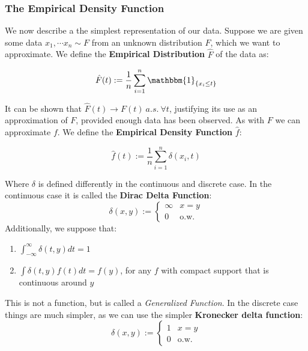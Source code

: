 \documentclass[]{article}
\theoremstyle{mattstyle}
\theoremstyle{definition}
\begin{document}
\subsubsection{The Empirical Density Function}

We now describe a the simplest representation of our data. Suppose we are given some data \(x_1, \cdots x_n \sim F\) from an unknown distribution $F$, which we want to approximate. We define the \textbf{Empirical Distribution} $\hat{F}$ of the data as:

\begin{equation}\label{sec:empdist}
\hat{F}(t) := \frac{1}{n}\sum_{i=1}^n \mathbbm{1}_{\{x_i \le t\}}
\end{equation} 

It can be shown that $\hat{F}(t) \rightarrow F(t) \ a.s.\ \forall t$, justifying its use as an approximation of $F$, provided enough data has been observed. As with $F$ we can approximate $f$. We define the \textbf{Empirical Density Function} $\hat{f}$:

\begin{equation}
\hat{f}(t) := \frac{1}{n}\sum_{i=1}^n \delta(x_i, t)
\end{equation}

Where $\delta$ is defined differently in the continuous and discrete case. In the continuous case it is called the \textbf{Dirac Delta Function}:
\begin{equation}
\delta(x,y) := \begin{cases}
\infty & x=y \\
0 & \text{o.w.}
\end{cases}
\end{equation}
Additionally, we suppose that:
\begin{enumerate}
	\item $\int_{-\infty}^{\infty} \delta(t,y)dt = 1$
	\item $\int \delta(t,y) f(t) dt = f(y)$, for any $f$ with compact support that is continuous around $y$
\end{enumerate}

This is not a function, but is called a \emph{Generalized Function}. In the discrete case things are much simpler, as we can use the simpler \textbf{Kronecker delta function}:
\begin{equation}
\delta(x,y) := 
\begin{cases}
1 & x=y \\
0 & \text{o.w.}
\end{cases}
\end{equation}
\end{document}
